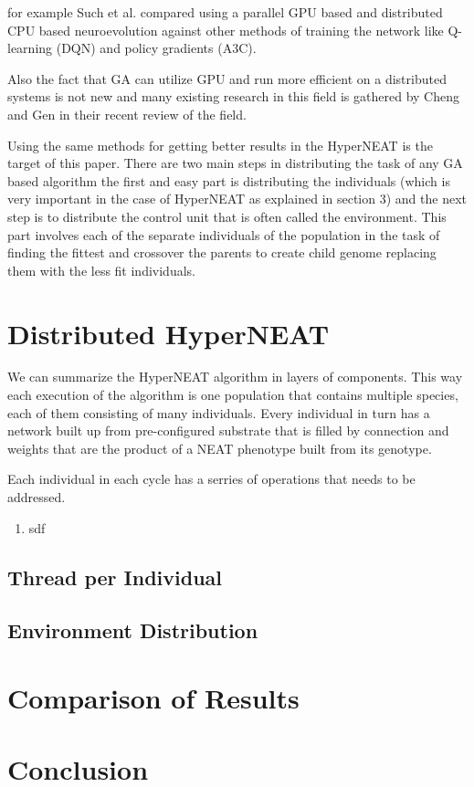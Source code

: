 \documentclass[twocolumn]{article}
\begin{document}
for example Such et al. compared using a parallel GPU based and distributed CPU based neuroevolution against other methods of training the network like Q-learning (DQN) and policy gradients (A3C). \cite{GA-GPU-Comparison}

Also the fact that GA can utilize GPU and run more efficient on a distributed systems is not new and many existing research in this field is gathered by Cheng and Gen in their recent review of the field. \cite{GA-GPU-Review}

Using the same methods for getting better results in the HyperNEAT is the target of this paper. There are two main steps in distributing the task of any GA based algorithm the first and easy part is distributing the individuals (which is very important in the case of HyperNEAT as explained in section 3) and the next step is to distribute the control unit that is often called the environment. This part involves each of the separate individuals of the population in the task of finding the fittest and crossover the parents to create child genome replacing them with the less fit individuals.


\section{Distributed HyperNEAT}
We can summarize the HyperNEAT algorithm in layers of components. This way each execution of the algorithm is one population that contains multiple species, each of them consisting of many individuals. Every individual in turn has a network built up from pre-configured substrate that is filled by connection and weights that are the product of a NEAT phenotype built from its genotype.

Each individual in each cycle has a serries of operations that needs to be addressed.

\begin{enumerate}
    \item sdf
\end{enumerate}

\subsection{Thread per Individual}
\subsection{Environment Distribution}


\section{Comparison of Results}


\section{Conclusion}




\end{document}
